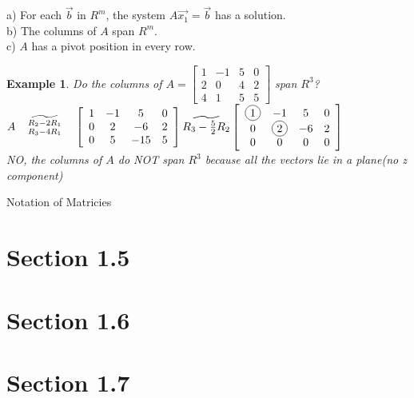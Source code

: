 \documentclass[a4paper,12pt,openany]{book}
\newcommand*{\bfrac}[2]{\genfrac{}{}{0pt}{}{#1}{#2}}
\newcommand*\circled[1]{\tikz[baseline=(char.base)]{
            \node[shape=circle,draw,inner sep=2pt] (char) {#1};}}
\theoremstyle{defn}
\theoremstyle{expl}
\newtheorem{expl}{Example}[section]
\begin{document}
a) For each $\vec{b}$ in $R^m$, the system $A\vec{x_1}=\vec{b}$ has a solution.\\
b) The columns of $A$ span $R^m$.\\
c) $A$ has a pivot position in every row.
\begin{expl}
\textup{
Do the columns of $A=\left[\begin{array}{cccc}1&-1&5&0\\2&0&4&2\\4&1&5&5\end{array}\right]$ span $R^3$?\\
$A\quad\widetilde{\bfrac{R_2-2R_1}{R_3-4R_1}}\quad\left[\begin{array}{cccc}1&-1&5&0\\0&2&-6&2\\0&5&-15&5\end{array}\right]
\widetilde{R_3-\frac{5}{2}R_2}\left[\begin{array}{cccc}\circled{1}&-1&5&0\\0&\circled{2}&-6&2\\0&0&0&0\end{array}\right]$\\
NO, the columns of $A$ do NOT span $R^3$ because all the vectors lie in a plane(no z component)
}\end{expl}
Notation of Matricies
\section{Section 1.5}
\section{Section 1.6}
\section{Section 1.7}
\end{document}
